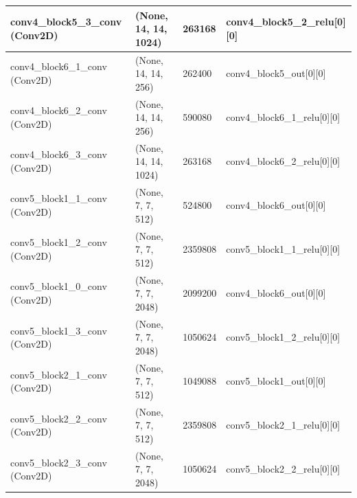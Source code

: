 \documentclass[12pt,oneside,geqno]{article}
\begin{document}
\begin{table}[]
{\begin{tabular}{llll}
				\multicolumn{1}{|l|}{conv4\_block5\_3\_conv (Conv2D)}  & \multicolumn{1}{l|}{(None, 14, 14, 1024)} & \multicolumn{1}{l|}{263168}  & \multicolumn{1}{l|}{conv4\_block5\_2\_relu{[}0{]}{[}0{]}} \\ \hline
				\multicolumn{1}{|l|}{conv4\_block6\_1\_conv (Conv2D)}  & \multicolumn{1}{l|}{(None, 14, 14, 256)}  & \multicolumn{1}{l|}{262400}  & \multicolumn{1}{l|}{conv4\_block5\_out{[}0{]}{[}0{]}}     \\ \hline
				\multicolumn{1}{|l|}{conv4\_block6\_2\_conv (Conv2D)}  & \multicolumn{1}{l|}{(None, 14, 14, 256)}  & \multicolumn{1}{l|}{590080}  & \multicolumn{1}{l|}{conv4\_block6\_1\_relu{[}0{]}{[}0{]}} \\ \hline
				\multicolumn{1}{|l|}{conv4\_block6\_3\_conv (Conv2D)}  & \multicolumn{1}{l|}{(None, 14, 14, 1024)} & \multicolumn{1}{l|}{263168}  & \multicolumn{1}{l|}{conv4\_block6\_2\_relu{[}0{]}{[}0{]}} \\ \hline
				\multicolumn{1}{|l|}{conv5\_block1\_1\_conv (Conv2D)}  & \multicolumn{1}{l|}{(None, 7, 7, 512)}    & \multicolumn{1}{l|}{524800}  & \multicolumn{1}{l|}{conv4\_block6\_out{[}0{]}{[}0{]}}     \\ \hline
				\multicolumn{1}{|l|}{conv5\_block1\_2\_conv (Conv2D)}  & \multicolumn{1}{l|}{(None, 7, 7, 512)}    & \multicolumn{1}{l|}{2359808} & \multicolumn{1}{l|}{conv5\_block1\_1\_relu{[}0{]}{[}0{]}} \\ \hline
				\multicolumn{1}{|l|}{conv5\_block1\_0\_conv (Conv2D)}  & \multicolumn{1}{l|}{(None, 7, 7, 2048)}   & \multicolumn{1}{l|}{2099200} & \multicolumn{1}{l|}{conv4\_block6\_out{[}0{]}{[}0{]}}     \\ \hline
				\multicolumn{1}{|l|}{conv5\_block1\_3\_conv (Conv2D)}  & \multicolumn{1}{l|}{(None, 7, 7, 2048)}   & \multicolumn{1}{l|}{1050624} & \multicolumn{1}{l|}{conv5\_block1\_2\_relu{[}0{]}{[}0{]}} \\ \hline
				\multicolumn{1}{|l|}{conv5\_block2\_1\_conv (Conv2D)}  & \multicolumn{1}{l|}{(None, 7, 7, 512)}    & \multicolumn{1}{l|}{1049088} & \multicolumn{1}{l|}{conv5\_block1\_out{[}0{]}{[}0{]}}     \\ \hline
				\multicolumn{1}{|l|}{conv5\_block2\_2\_conv (Conv2D)}  & \multicolumn{1}{l|}{(None, 7, 7, 512)}    & \multicolumn{1}{l|}{2359808} & \multicolumn{1}{l|}{conv5\_block2\_1\_relu{[}0{]}{[}0{]}} \\ \hline
				\multicolumn{1}{|l|}{conv5\_block2\_3\_conv (Conv2D)}  & \multicolumn{1}{l|}{(None, 7, 7, 2048)}   & \multicolumn{1}{l|}{1050624} & \multicolumn{1}{l|}{conv5\_block2\_2\_relu{[}0{]}{[}0{]}} \\ \hline

\end{tabular}}
\end{table}
\end{document}
